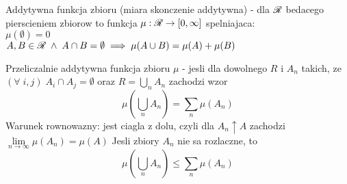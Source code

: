 \begin{multicols*}{2}
    {\color{def}Addytywna funkcja zbioru} (miara skonczenie addytywna) - dla $\mathcal{R}$ bedacego pierscieniem zbiorow to funkcja $\mu:\mathcal{R}\to [0,\infty]$ spelniajaca:\smallskip\\
    \point $\mu(\emptyset) = 0$\smallskip\\
    \point $A,B\in\mathcal{R}\;\land\;A\cap B=\emptyset\implies \mu(A\cup B)=\mu(A)+\mu(B)$\medskip

    {\color{def}Przeliczalnie addytywna funkcja zbioru} $\mu$ - jesli dla dowolnego $R$ i $A_n$ takich, ze $(\forall\;i,j)\;A_i\cap A_j=\emptyset$ oraz $R=\bigcup\limits_n A_n$ zachodzi wzor
    $$\mu(\bigcup\limits_n A_n)=\sum\limits_n\mu(A_n)$$
    {\color{acc}Warunek rownowazny}: jest ciagla z dolu, czyli dla $A_n\uparrow A$ zachodzi $\lim\limits_{n\to\infty}\mu(A_n)=\mu(A)$
    Jesli zbiory $A_n$ nie sa rozlaczne, to 
    $$\mu(\bigcup\limits_n A_n)\leq\sum\limits_n\mu(A_n)$$

\end{multicols*}